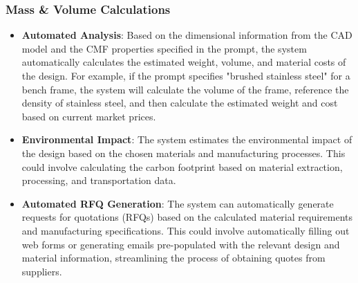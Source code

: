 \documentclass[12pt]{report}
\begin{document}
\subsubsection{Mass \& Volume Calculations}
\begin{itemize}
\item \textbf{Automated Analysis}: Based on the dimensional information from the CAD model and the CMF properties specified in the prompt, the system automatically calculates the estimated weight, volume, and material costs of the design. For example, if the prompt specifies "brushed stainless steel" for a bench frame, the system will calculate the volume of the frame, reference the density of stainless steel, and then calculate the estimated weight and cost based on current market prices.
\item \textbf{Environmental Impact}: The system estimates the environmental impact of the design based on the chosen materials and manufacturing processes. This could involve calculating the carbon footprint based on material extraction, processing, and transportation data. 
\item \textbf{Automated RFQ Generation}: The system can automatically generate requests for quotations (RFQs) based on the calculated material requirements and manufacturing specifications. This could involve automatically filling out web forms or generating emails pre-populated with the relevant design and material information, streamlining the process of obtaining quotes from suppliers.
\end{itemize}
\end{document}
